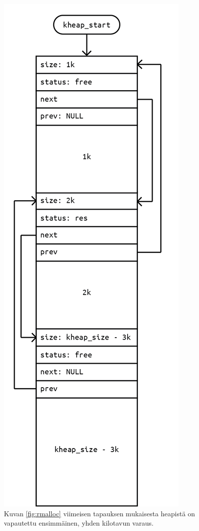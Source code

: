 \begin{figure}[H]
\centering
\includegraphics[]{../figures/rfree.png}
\caption{Kuvan \ref{fig:rmalloc} viimeisen tapauksen mukaisesta heapistä on vapautettu ensimmäinen, yhden kilotavun varaus.}
\label{fig:rfree}
\end{figure}

